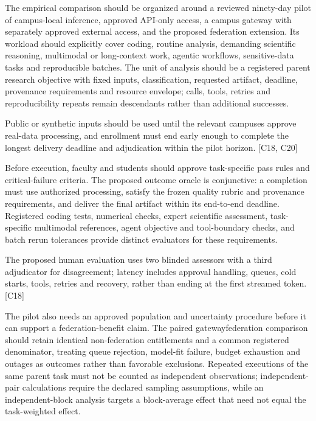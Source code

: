 \documentclass[11pt]{article}
\begin{document}
The empirical comparison should be organized around a reviewed ninety-day pilot of campus-local inference, approved API-only access, a campus gateway with separately approved external access, and the proposed federation extension. Its workload should explicitly cover coding, routine analysis, demanding scientific reasoning, multimodal or long-context work, agentic workflows, sensitive-data tasks and reproducible batches. The unit of analysis should be a registered parent research objective with fixed inputs, classification, requested artifact, deadline, provenance requirements and resource envelope; calls, tools, retries and reproducibility repeats remain descendants rather than additional successes.

Public or synthetic inputs should be used until the relevant campuses approve real-data processing, and enrollment must end early enough to complete the longest delivery deadline and adjudication within the pilot horizon. [C18, C20]

Before execution, faculty and students should approve task-specific pass rules and critical-failure criteria. The proposed outcome oracle is conjunctive: a completion must use authorized processing, satisfy the frozen quality rubric and provenance requirements, and deliver the final artifact within its end-to-end deadline. Registered coding tests, numerical checks, expert scientific assessment, task-specific multimodal references, agent objective and tool-boundary checks, and batch rerun tolerances provide distinct evaluators for these requirements.

The proposed human evaluation uses two blinded assessors with a third adjudicator for disagreement; latency includes approval handling, queues, cold starts, tools, retries and recovery, rather than ending at the first streamed token. [C18]

The pilot also needs an approved population and uncertainty procedure before it can support a federation-benefit claim. The paired gateway\textendash{}federation comparison should retain identical non-federation entitlements and a common registered denominator, treating queue rejection, model-fit failure, budget exhaustion and outages as outcomes rather than favorable exclusions. Repeated executions of the same parent task must not be counted as independent observations; independent-pair calculations require the declared sampling assumptions, while an independent-block analysis targets a block-average effect that need not equal the task-weighted effect.
\end{document}
